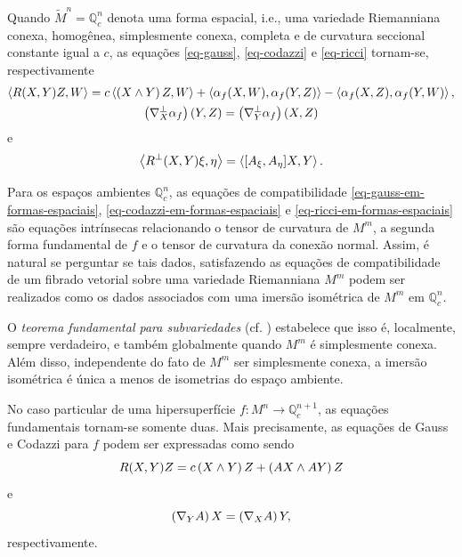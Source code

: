 Quando $\tilde{M}^n = \mathbb{Q}^n_c$ denota uma forma espacial, i.e., uma variedade Riemanniana conexa, homogênea, simplesmente conexa, completa e de curvatura seccional constante igual a $c$, as equações \eqref{eq-gauss}, \eqref{eq-codazzi} e \eqref{eq-ricci} tornam-se, respectivamente
\begin{gather}\label{eq-gauss-em-formas-espaciais}
\left\langle R(X,Y)Z,W \right\rangle = c \left\langle \left( X \wedge Y \right) Z,W \right\rangle + \left\langle \alpha_f (X,W),\alpha_f(Y,Z) \right\rangle - \left\langle \alpha_f (X,Z),\alpha_f (Y,W) \right\rangle,\\
\label{eq-codazzi-em-formas-espaciais}
\left( \nabla^\perp_X \alpha_f \right)(Y,Z) = \left( \nabla^\perp_Y \alpha_f \right)(X,Z)
\end{gather}
e
\begin{equation}\label{eq-ricci-em-formas-espaciais}
\left\langle R^\perp (X,Y) \xi,\eta \right\rangle = \left\langle [A_\xi, A_\eta] X,Y \right\rangle.
\end{equation}

Para os espaços ambientes $\mathbb{Q}^n_c$, as equações de compatibilidade \eqref{eq-gauss-em-formas-espaciais}, \eqref{eq-codazzi-em-formas-espaciais} e \eqref{eq-ricci-em-formas-espaciais} são equações intrínsecas relacionando o tensor de curvatura de $M^m$, a segunda forma fundamental de $f$ e o tensor de curvatura da conexão normal. Assim, é natural se perguntar se tais dados, satisfazendo as equações de compatibilidade de um fibrado vetorial sobre uma variedade Riemanniana $M^m$ podem ser realizados como os dados associados com uma imersão isométrica de $M^m$ em $\mathbb{Q}^n_c$.

O \emph{teorema fundamental para subvariedades} (cf. \cite[Theorem 1.10]{Dajczer2019}) estabelece que isso é, localmente, sempre verdadeiro, e também globalmente quando $M^m$ é simplesmente conexa. Além disso, independente do fato de $M^m$ ser simplesmente conexa, a imersão isométrica é única a menos de isometrias do espaço ambiente.

No caso particular de uma hipersuperfície $f: M^n \rightarrow \mathbb{Q}^{n+1}_c$, as equações fundamentais tornam-se somente duas. Mais precisamente, as equações de Gauss e Codazzi para $f$ podem ser expressadas como sendo
\begin{equation}
	R(X,Y)Z = c \left( X \wedge Y \right) Z + \left( AX \wedge AY \right) Z
\end{equation}
e
\begin{equation}
	\left( \nabla_Y A \right) X = \left( \nabla_X A \right) Y,
\end{equation}
respectivamente.

